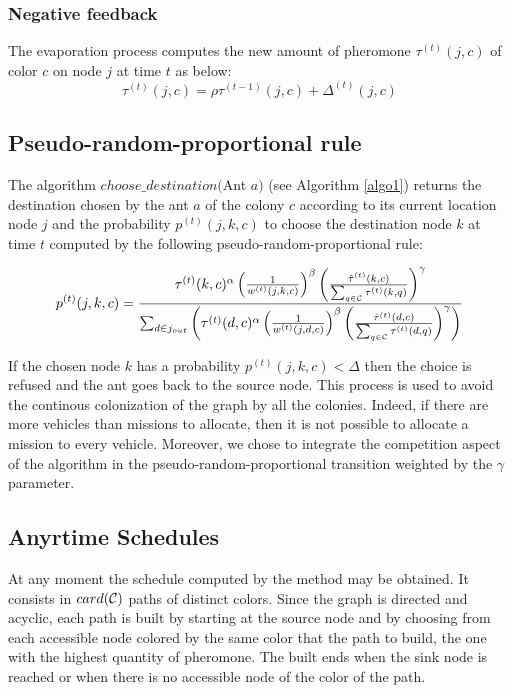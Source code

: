 \documentclass[a4paper,10pt]{article}
\begin{document}
\subsubsection{Negative feedback}
The evaporation process computes the new amount of pheromone $\tau^{(t)}(j,c)$ of color $c$ on node $j$ at time $t$ as below:
\begin{equation*}
 \tau^{(t)}(j,c) = \rho \tau^{(t-1)}(j,c) + \Delta^{(t)}(j,c)
\end{equation*}

\subsection{Pseudo-random-proportional rule}
The algorithm $choose\_destination($Ant $a)$ (see Algorithm \ref{algo1}) returns the destination chosen by the ant $a$ of the colony $c$ according to its current location node $j$ and the probability $p^{(t)}(j,k,c)$ to choose the destination node $k$ at time $t$ computed by the following pseudo-random-proportional rule:

\begin{equation*}
  p^{(t)}(j,k,c) = \frac
    {
      \tau^{(t)}(k,c)^{\alpha}
      \left( \frac{1}{w^{(t)}(j,k,c)} \right) ^{\beta}
      \left( \frac{\hat \tau^{(t)}(k,c)}{\sum_{q \in \cal{C}} \tau^{(t)}(k,q)} \right)^{\gamma}
    }
    {
      \sum_{d \in j_{out}} \left(
	\tau^{(t)}(d,c)^{\alpha}
	\left( \frac{1}{w^{(t)}(j,d,c)} \right)^{\beta}
	\left( \frac{\hat \tau^{(t)}(d,c)}{\sum_{q \in \cal{C}} \tau^{(t)}(d,q)} \right)^{\gamma}
      \right)
    }
\end{equation*}

If the chosen node $k$ has a probability $p^{(t)}(j,k,c) < \Delta$ then the choice is refused and the ant goes back to the source node. This process is used to avoid the continous colonization of the graph by all the colonies. Indeed, if there are more vehicles than missions to allocate, then it is not possible to allocate a mission to every vehicle. Moreover, we chose to integrate the competition aspect of the algorithm in the pseudo-random-proportional transition weighted by the $\gamma$ parameter.

\subsection{Anyrtime Schedules}
At any moment the schedule computed by the method may be obtained. It consists in $card(\cal{C})$ paths of distinct colors. Since the graph is directed and acyclic, each path is built by starting at the source node and by choosing from each accessible node colored by the same color that the path to build, the one with the highest quantity of pheromone. The built ends when the sink node is reached or when there is no accessible node of the color of the path.
\end{document}
